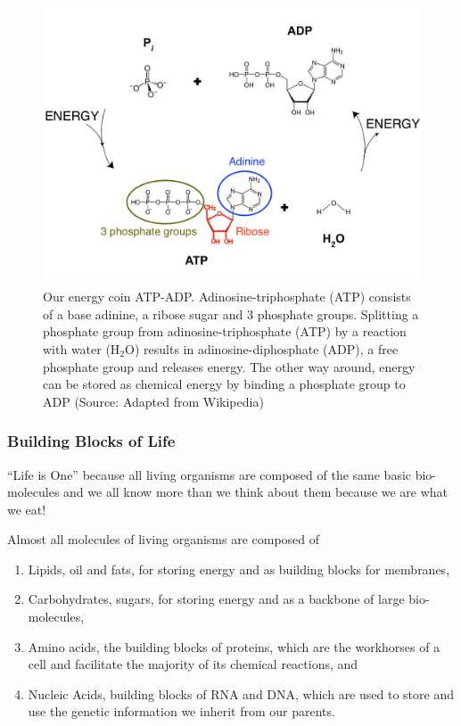 \documentclass[
  11pt,
]{book}
\providecommand{\tightlist}{%
  \setlength{\itemsep}{0pt}\setlength{\parskip}{0pt}}
\begin{document}
\begin{figure}

{\centering \includegraphics[width=0.7\linewidth]{./figs/ATP-ADP} 

}

\caption{Our energy coin ATP-ADP. Adinosine-triphosphate (ATP) consists of a base adinine, a ribose sugar and 3 phosphate groups. Splitting a phosphate group from adinosine-triphosphate (ATP) by a reaction with water (H\(_2\)O) results in adinosine-diphosphate (ADP), a free phosphate group and releases energy. The other way around, energy can be stored as chemical energy by binding a phosphate group to ADP (Source: Adapted from Wikipedia)}\label{fig:atp-adp}
\end{figure}

\pagebreak

\hypertarget{building-blocks-of-life}{%
\subsubsection{Building Blocks of Life}\label{building-blocks-of-life}}

``Life is One'' because all living organisms are composed of the same basic bio-molecules and we all know more than we think about them because we are what we eat!

Almost all molecules of living organisms are composed of

\begin{enumerate}
\def\labelenumi{\arabic{enumi}.}
\tightlist
\item
  Lipids, oil and fats, for storing energy and as building blocks for membranes,
\item
  Carbohydrates, sugars, for storing energy and as a backbone of large bio-molecules,
\item
  Amino acids, the building blocks of proteins, which are the workhorses of a cell and facilitate the majority of its chemical reactions, and
\item
  Nucleic Acids, building blocks of RNA and DNA, which are used to store and use the genetic information we inherit from our parents.
\end{enumerate}
\end{document}
